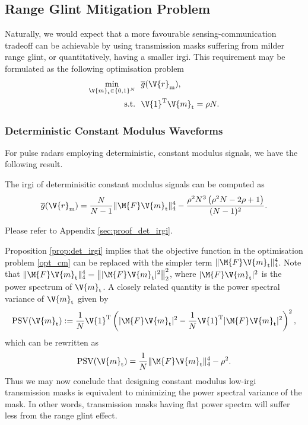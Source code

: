\documentclass[journal,a4paper,10pt, romanappendices]{IEEEtran}
\begin{document}
\subsection{Range Glint Mitigation Problem}
Naturally, we would expect that a more favourable sensing-communication tradeoff can be achievable by using transmission masks suffering from milder range glint, or quantitatively, having a smaller \ac{irgi}. This requirement may be formulated as the following optimisation problem
\begin{subequations}\label{opt_cm}
\begin{align}
    \min_{\V{m}_{\rm t}\in\{0,1\}^N}&~~\overline{g}(\V{r}_{\rm m}),\\
    {\rm s.t.}&~~\V{1}^{\rm T}\V{m}_{\rm t}=\rho N.
\end{align}
\end{subequations}
\subsubsection{Deterministic Constant Modulus Waveforms}
For pulse radars employing deterministic, constant modulus signals, we have the following result.
\begin{proposition}\label{prop:det_irgi}
The \ac{irgi} of determinisitic constant modulus signals can be computed as 
\begin{equation}
\overline{g}(\V{r}_{\rm m}) =\frac{N}{N-1}\|\M{F}\V{m}_{\rm t}\|_4^4-\frac{\rho^2 N^3\left(\rho^2N-2\rho+1\right)}{(N-1)^2}.
\end{equation}
\begin{IEEEproof}
Please refer to Appendix \ref{sec:proof_det_irgi}.
\end{IEEEproof}
\end{proposition}

Proposition \ref{prop:det_irgi} implies that the objective function in the optimisation problem \eqref{opt_cm} can be replaced with the simpler term $\|\M{F}\V{m}_{\rm t}\|_4^4$. Note that $\|\M{F}\V{m}_{\rm t}\|_4^4 = \left\||\M{F}\V{m}_{\rm t}|^2\right\|_2^2$, where $|\M{F}\V{m}_{\rm t}|^2$ is the power spectrum of $\V{m}_{\rm t}$. A closely related quantity is the power spectral variance of $\V{m}_{\rm t}$ given by
\begin{equation}\label{psv}
{\rm PSV}(\V{m}_{\rm t}) := \frac{1}{N}\V{1}^{\rm T} \left(|\M{F}\V{m}_{\rm t}|^2-\frac{1}{N}\V{1}^{\rm T}|\M{F}\V{m}_{\rm t}|^2\right)^2,
\end{equation}
which can be rewritten as
$$
{\rm PSV}(\V{m}_{\rm t}) = \frac{1}{N}\|\M{F}\V{m}_{\rm t}\|_4^4-\rho^2.
$$
Thus we may now conclude that designing constant modulus low-\ac{irgi} transmission masks is equivalent to minimizing the power spectral variance of the mask. In other words, transmission masks having flat power spectra will suffer less from the range glint effect.
\end{document}
